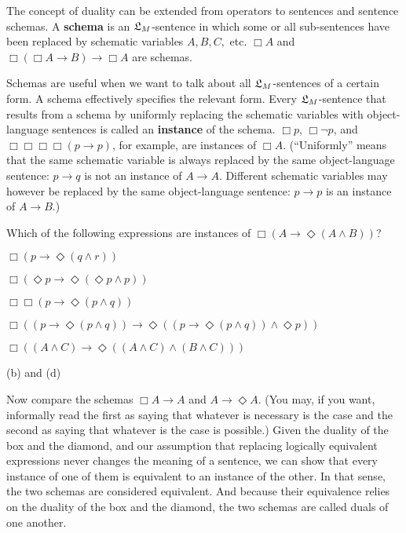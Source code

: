 The concept of duality can be extended from operators to sentences and sentence
schemas. A \textbf{schema} is an $\mathfrak{L}_{M}$-sentence in which some or all
sub-sentences have been replaced by schematic variables $A,B,C,$ etc. $\Box A$
and $\Box(\Box A \to B) \to \Box A$ are schemas.

Schemas are useful when we want to talk about all $\mathfrak{L}_{M}$-sentences of a
certain form. A schema effectively specifies the relevant form. Every
$\mathfrak{L}_{M}$-sentence that results from a schema by uniformly replacing the
schematic variables with object-language sentences is called an
\textbf{instance} of the schema. $\Box p$, $\Box \neg p$, and
$\Box \Box\Box\Box(p\to p)$, for example, are instances of $\Box A$.
(``Uniformly'' means that the same schematic variable is always replaced by the
same object-language sentence: $p \to q$ is not an instance of $A \to A$.
Different schematic variables may however be replaced by the same
object-language sentence: $p \to p$ is an instance of $A \to B$.)

\begin{exercise}
  Which of the following expressions are instances of
  $\Box(A\to \Diamond (A \land B))$?
  \begin{exlist}
  \item $\Box(p \to \Diamond (q\land r))$
  \item $\Box(\Diamond p \to \Diamond (\Diamond p\land p))$
  \item $\Box\Box(p \to \Diamond (p \land q))$
  \item $\Box((p \to \Diamond (p \land q)) \to \Diamond((p \to \Diamond (p \land q)) \land \Diamond p))$
  \item $\Box((A\land C) \to \Diamond ((A\land C) \land (B\land C)))$
  \end{exlist}
\end{exercise}
\begin{solution}
  (b) and (d)
\end{solution}

Now compare the schemas $\Box A \to A$ and $A \to \Diamond A$. (You may, if you
want, informally read the first as saying that whatever is necessary is the case
and the second as saying that whatever is the case is possible.) Given the
duality of the box and the diamond, and our assumption that replacing logically
equivalent expressions never changes the meaning of a sentence, we can show that
every instance of one of them is equivalent to an instance of the other. In that
sense, the two schemas are considered equivalent. And because their equivalence
relies on the duality of the box and the diamond, the two schemas are called
duals of one another.

